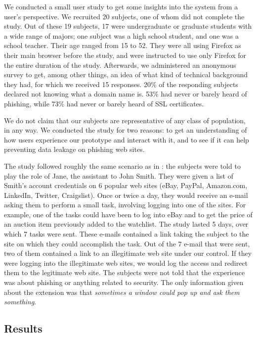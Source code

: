 \documentclass[11pt,styles/chicago]{article}
\begin{document}
We conducted a small user study to get some insights into the system from a user's perspective. We recruited 20 subjects, one of whom did not complete the study. Out of these 19 subjects, 17 were undergraduate or graduate students with a wide range of majors; one subject was a high school student, and one was a school teacher. Their age ranged from 15 to 52. %
They were all using Firefox as their main browser before the study, and were instructed to use only Firefox for the entire duration of the study. Afterwards, we administered an anonymous survey to get, among other things, an idea of what kind of technical background they had, for which we received 15 responses. 20\% of the responding subjects declared not knowing what a domain name is. 53\% had never or barely heard of phishing, while 73\% had never or barely heard of SSL certificates.

We do not claim that our subjects are representative of any class of population, in any way. We conducted the study for two reasons: to get an understanding of how users experience our prototype and interact with it, and to see if it can help preventing data leakage on phishing web sites.

The study followed roughly the same scenario as in \cite{wu2006web}: the subjects were told to play the role of Jane, the assistant to John Smith. They were given a list of Smith's account credentials on 6 popular web sites (eBay, PayPal, Amazon.com, LinkedIn, Twitter, Craigslist). Once or twice a day, they would receive an e-mail asking them to perform a small task, involving logging into one of the sites. For example, one of the tasks could have been to log into eBay and to get the price of an auction item previously added to the watchlist. The study lasted 5 days, over which 7 tasks were sent. These e-mails contained a link taking the subject to the site on which they could accomplish the task. Out of the 7 e-mail that were sent, two of them contained a link to an illegitimate web site under our control. If they were logging into the illegitimate web sites, we would log the access and redirect them to the legitimate web site. The subjects were not told that the experience was about phishing or anything related to security. The only information given about the extension was that \emph{sometimes a window could pop up and ask them something}.

\subsection{Results}
\end{document}
